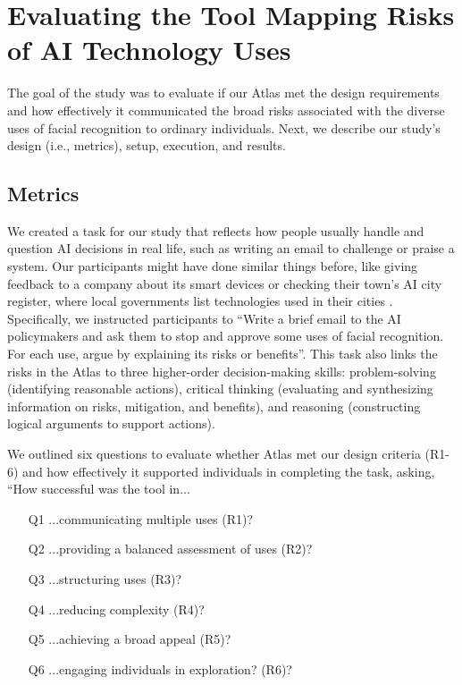 \section{Evaluating the Tool Mapping Risks of AI Technology Uses}
The goal of the study was to evaluate if our Atlas met the design requirements and how effectively it communicated the broad risks associated with the diverse uses of facial recognition to ordinary individuals. Next, we describe our study's design (i.e., metrics), setup, execution, and results.

\subsection{Metrics}
We created a task for our study that reflects how people usually handle and question AI decisions in real life, such as writing an email to challenge or praise a system\cite{contestableCars2023}. Our participants might have done similar things before, like giving feedback to a company about its smart devices or checking their town's AI city register, where local governments list technologies used in their cities \cite{cityRegister}. Specifically, we instructed participants to ``Write a brief email to the AI policymakers and ask them to stop and approve some uses of facial recognition. For each use, argue by explaining its risks or benefits''. This task also links the risks in the Atlas to three higher-order decision-making skills: problem-solving (identifying reasonable actions), critical thinking (evaluating and synthesizing information on risks, mitigation, and benefits), and reasoning (constructing logical arguments to support actions).

We outlined six questions to evaluate whether Atlas met our design criteria (R1-6) and how effectively it supported individuals in completing the task, asking, ``How successful was the tool in...    
\begin{enumerate}
    \addtolength{\leftskip}{5pt}
    \setlength{\itemsep}{0pt}
    \setlength{\parskip}{0pt}
    \setlength{\parsep}{0pt}
    \item [Q1] ...communicating multiple uses (R1)?
    \item [Q2] ...providing a balanced assessment of uses (R2)?
    \item [Q3] ...structuring uses (R3)?
    \item [Q4] ...reducing complexity (R4)?
    \item [Q5] ...achieving a broad appeal (R5)?
    \item [Q6] ...engaging individuals in exploration? (R6)?
\end{enumerate}

